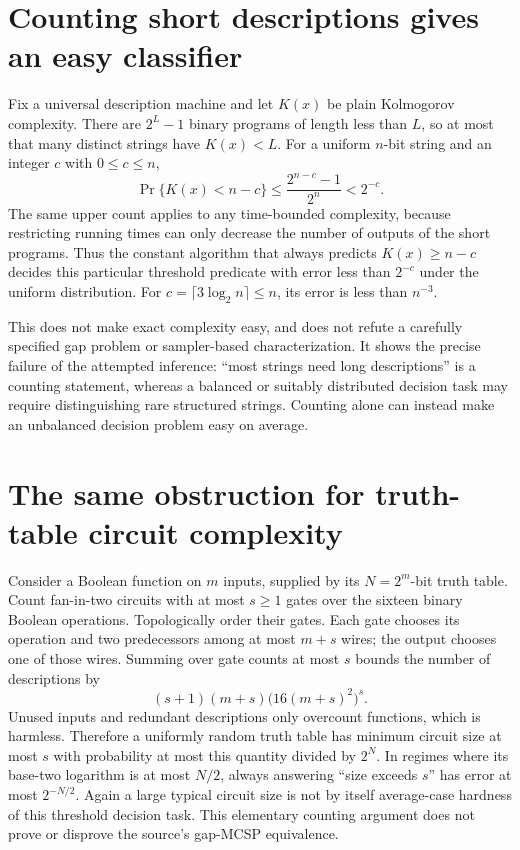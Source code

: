 \documentclass[11pt]{article}
\begin{document}
\section{Counting short descriptions gives an easy classifier}
Fix a universal description machine and let $K(x)$ be plain
Kolmogorov complexity. There are $2^L-1$ binary programs of
length less than $L$, so at most that many distinct strings
have $K(x)<L$. For a uniform $n$-bit string and an integer $c$ with $0\le c\le n$,
\[
 \Pr\{K(x)<n-c\}\le\frac{2^{n-c}-1}{2^n}<2^{-c}.
\]
The same upper count applies to any time-bounded complexity,
because restricting running times can only decrease the number
of outputs of the short programs. Thus the constant algorithm
that always predicts $K(x)\ge n-c$ decides this particular
threshold predicate with error less than $2^{-c}$ under the
uniform distribution. For $c=\lceil3\log_2n\rceil\le n$,
its error is less than $n^{-3}$.

This does not make exact complexity easy, and does not refute a
carefully specified gap problem or sampler-based characterization.
It shows the precise failure of the attempted inference:
``most strings need long descriptions'' is a counting statement,
whereas a balanced or suitably distributed decision task may
require distinguishing rare structured strings. Counting alone
can instead make an unbalanced decision problem easy on average.

\section{The same obstruction for truth-table circuit complexity}
Consider a Boolean function on $m$ inputs, supplied by its
$N=2^m$-bit truth table. Count fan-in-two circuits with at most
$s\ge1$ gates over the sixteen binary Boolean operations.
Topologically order their gates. Each gate chooses its operation
and two predecessors among at most $m+s$ wires; the output
chooses one of those wires. Summing over gate counts at most
$s$ bounds the number of descriptions by
\[
 (s+1)(m+s)\bigl(16(m+s)^2\bigr)^s.
\]
Unused inputs and redundant descriptions only overcount functions,
which is harmless. Therefore a uniformly random truth table has
minimum circuit size at most $s$ with probability at most this
quantity divided by $2^N$. In regimes where its base-two
logarithm is at most $N/2$, always answering ``size exceeds $s$''
has error at most $2^{-N/2}$. Again a large typical circuit
size is not by itself average-case hardness of this threshold
decision task. This elementary counting argument does not prove
or disprove the source's gap-MCSP equivalence.
\end{document}
